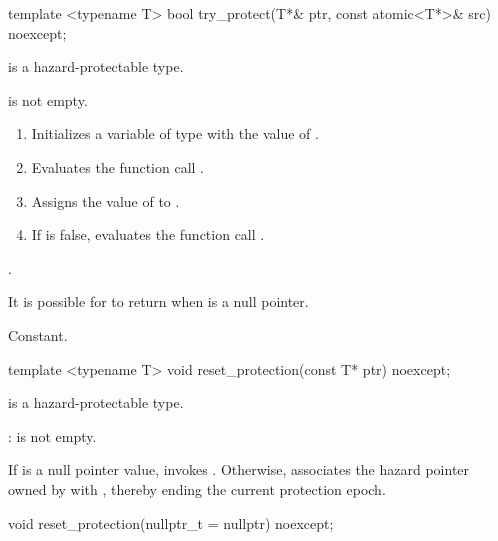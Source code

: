 \begin{itemdecl}
template <typename T> bool try_protect(T*& ptr, const atomic<T*>& src) noexcept;
\end{itemdecl}

\begin{itemdescr}

\mandates
{} is a hazard-protectable type.

\expects
{} is not empty.

\effects
\begin{enumerate}
\item Initializes a variable  of type  with the value of .
\item Evaluates the function call .
\item Assigns the value of  to .
\item If  is false, evaluates the function call .
\end{enumerate}

\returns
{}. \begin{note} It is possible for  to return  when  is a null pointer.\end{note}

\complexity
Constant.

\end{itemdescr}

\begin{itemdecl}
template <typename T> void reset_protection(const T* ptr) noexcept;
\end{itemdecl}

\begin{itemdescr}

\mandates
{} is a hazard-protectable type.

{}: 
 is not empty.

\effects 
If  is a null pointer value, invokes . Otherwise, associates the hazard pointer owned by  with , thereby ending the current protection epoch.

\end{itemdescr}

\begin{itemdecl}
void reset_protection(nullptr_t = nullptr) noexcept;
\end{itemdecl}

